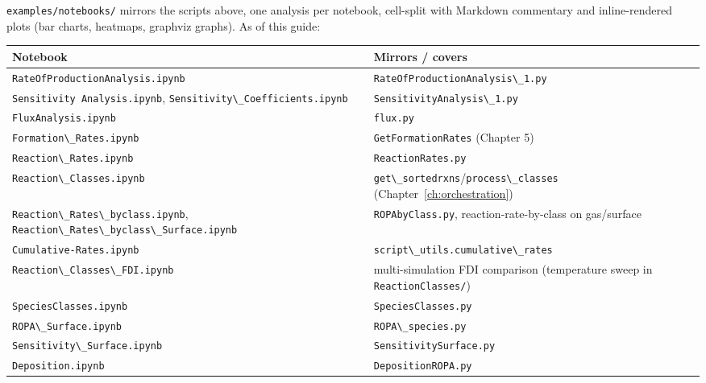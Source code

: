 \documentclass[11pt,a4paper]{report}
\newcommand{\pkg}[1]{\lstinline|#1|}
\begin{document}
\pkg{examples/notebooks/} mirrors the scripts above, one analysis per
notebook, cell-split with Markdown commentary and inline-rendered plots
(bar charts, heatmaps, graphviz graphs). As of this guide:

\begin{center}
\small
\begin{longtable}{p{6.5cm}p{9cm}}
\toprule
\textbf{Notebook} & \textbf{Mirrors / covers} \\
\midrule
\endhead
\pkg{RateOfProductionAnalysis.ipynb} & \pkg{RateOfProductionAnalysis\_1.py} \\
\pkg{Sensitivity Analysis.ipynb}, \pkg{Sensitivity\_Coefficients.ipynb} & \pkg{SensitivityAnalysis\_1.py} \\
\pkg{FluxAnalysis.ipynb} & \pkg{flux.py} \\
\pkg{Formation\_Rates.ipynb} & \pkg{GetFormationRates} (Chapter 5) \\
\pkg{Reaction\_Rates.ipynb} & \pkg{ReactionRates.py} \\
\pkg{Reaction\_Classes.ipynb} & \pkg{get\_sortedrxns}/\pkg{process\_classes} (Chapter~\ref{ch:orchestration}) \\
\pkg{Reaction\_Rates\_byclass.ipynb}, \pkg{Reaction\_Rates\_byclass\_Surface.ipynb} & \pkg{ROPAbyClass.py}, reaction-rate-by-class on gas/surface \\
\pkg{Cumulative-Rates.ipynb} & \pkg{script\_utils.cumulative\_rates} \\
\pkg{Reaction\_Classes\_FDI.ipynb} & multi-simulation FDI comparison (temperature sweep in \pkg{ReactionClasses/}) \\
\pkg{SpeciesClasses.ipynb} & \pkg{SpeciesClasses.py} \\
\pkg{ROPA\_Surface.ipynb} & \pkg{ROPA\_species.py} \\
\pkg{Sensitivity\_Surface.ipynb} & \pkg{SensitivitySurface.py} \\
\pkg{Deposition.ipynb} & \pkg{DepositionROPA.py} \\
\bottomrule
\end{longtable}
\end{center}
\end{document}
